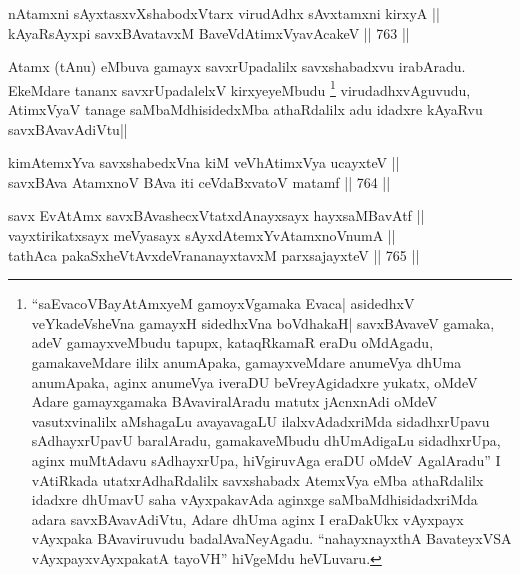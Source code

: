 
\begin{shl}
nA\s \s tamxni sAyxtasxvXshabodxV\s tarx virudAdhx sAvxtamxni kirxyA || \\
kAyaRsAyxpi savxBAvatavxM BaveVdAtimxVyavAcakeV ||  763 || 
\end{shl}

\begin{artha}
Atamx (tAnu) eMbuva gamayx savxrUpadalilx savxshabadxvu irabAradu. EkeMdare tananx savxrUpadalelxV kirxyeyeMbudu \footnote{``saEvacoVBayAtAmx\s yeM gamoyxVgamaka Evaca| asidedhxV veYkadeVsheVna gamayxH sidedhxVna boVdhakaH| savxBAvaveV gamaka, adeV gamayxveMbudu tapupx, kataqRkamaR eraDu oMdAgadu, gamakaveMdare ililx anumApaka, gamayxveMdare anumeVya dhUma anumApaka, aginx anumeVya iveraDU beVreyAgidadxre yukatx, oMdeV Adare gamayxgamaka BAvaviralAradu matutx jAcnxnAdi oMdeV vasutxvinalilx aMshagaLu avayavagaLU ilalxvAdadxriMda sidadhxrUpavu sAdhayxrUpavU baralAradu, gamakaveMbudu dhUmAdigaLu sidadhxrUpa, aginx muMtAdavu sAdhayxrUpa, hiVgiruvAga eraDU oMdeV AgalAradu'' I vAtiRkada utatxrAdhaRdalilx savxshabadx AtemxVya eMba athaRdalilx idadxre dhUmavU saha vAyxpakavAda aginxge saMbaMdhisidadxriMda adara savxBAvavAdiVtu, Adare dhUma aginx I eraDakUkx vAyxpayx vAyxpaka BAvaviruvudu badalAvaNeyAgadu. ``nahayxnayxthA BavateyxVSA vAyxpayxvAyxpakatA tayoVH'' hiVgeMdu heVLuvaru.} virudadhxvAguvudu, AtimxVyaV tanage saMbaMdhisidedxMba athaRdalilx adu idadxre kAyaRvu savxBAvavAdiVtu||
\end{artha}


\begin{shl}
kimAtemxYva savxshabedxVna kiM veVhA\s \s timxVya ucayxteV || \\
savxBAva AtamxnoV BAva iti ceVdaBxvatoV matamf ||  764 ||  
\end{shl}
				
\begin{shl}
savx EvA\s \s tAmx savxBAvashecxVtatxdA\s nayxsayx hayxsaMBavAtf || \\
vayxtirikatxsayx meVyasayx sAyxdAtemxYvA\s \s tamxnoV\s numA || \\
tathAca pakaSxheVtAvxdeVrananayxtavxM parxsajayxteV ||  765 ||  
\end{shl}

